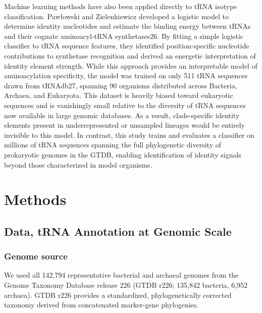 \documentclass{article}
\begin{document}
Machine learning methods have also been applied directly to tRNA isotype classification. Pawłowski and Zielenkiewicz developed a logistic model to determine identity nucleotides and estimate the binding energy between tRNAs and their cognate aminoacyl-tRNA synthetases26. By fitting a simple logistic classifier to tRNA sequence features, they identified position-specific nucleotide contributions to synthetase recognition and derived an energetic interpretation of identity element strength. While this approach provides an interpretable model of aminoacylation specificity, the model was trained on only 511 tRNA sequences drawn from tRNAdb27, spanning 90 organisms distributed across Bacteria, Archaea, and Eukaryota. This dataset is heavily biased toward eukaryotic sequences and is vanishingly small relative to the diversity of tRNA sequences now available in large genomic databases. As a result, clade-specific identity elements present in underrepresented or unsampled lineages would be entirely invisible to this model. In contrast, this study trains and evaluates a classifier on millions of tRNA sequences spanning the full phylogenetic diversity of prokaryotic genomes in the GTDB, enabling identification of identity signals beyond those characterized in model organisms.

\section{Methods}

\subsection{Data, tRNA Annotation at Genomic Scale}
\subsubsection{Genome source}
We used all 142,794 representative bacterial and archaeal genomes from the Genome Taxonomy Database release 226 (GTDB r226; 135,842 bacteria, 6,952 archaea). GTDB r226 provides a standardized, phylogenetically corrected taxonomy derived from concatenated marker-gene phylogenies.
\end{document}
